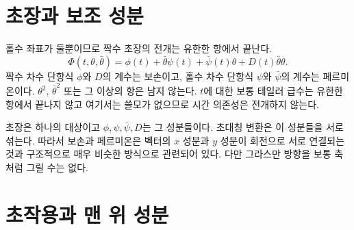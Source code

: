 \begin{classroomqa}
\end{classroomqa}

\section{초장과 보조 성분}

홀수 좌표가 둘뿐이므로 짝수 초장의 전개는 유한한 항에서 끝난다.
\begin{equation}
\Phi(t,\theta,\bar\theta)
=\phi(t)+\bar\theta\psi(t)+\bar\psi(t)\theta
+D(t)\bar\theta\theta.
\label{eq:l7-superfield}
\end{equation}
짝수 차수 단항식 \(\phi\)와 \(D\)의 계수는 보손이고, 홀수 차수 단항식 \(\psi\)와 \(\bar\psi\)의 계수는 페르미온이다. \(\theta^2\), \(\bar\theta^2\) 또는 그 이상의 항은 남지 않는다. \(t\)에 대한 보통 테일러 급수는 유한한 항에서 끝나지 않고 여기서는 쓸모가 없으므로 시간 의존성은 전개하지 않는다.

\begin{classroomqa}
\end{classroomqa}

초장은 하나의 대상이고 \(\phi,\psi,\bar\psi,D\)는 그 성분들이다. 초대칭 변환은 이 성분들을 서로 섞는다. 따라서 보손과 페르미온은 벡터의 \(x\) 성분과 \(y\) 성분이 회전으로 서로 연결되는 것과 구조적으로 매우 비슷한 방식으로 관련되어 있다. 다만 그라스만 방향을 보통 축처럼 그릴 수는 없다.

\section{초작용과 맨 위 성분}

